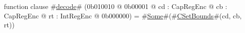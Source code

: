 function clause #\hyperref[sailMIPSzdecode]{decode}# (0b010010 @ 0b00001 @ cd : CapRegEnc @ cb : CapRegEnc @ rt : IntRegEnc @ 0b000000)      = #\hyperref[sailMIPSzSome]{Some}#(#\hyperref[sailMIPSzCSetBounds]{CSetBounds}#(cd, cb, rt))
